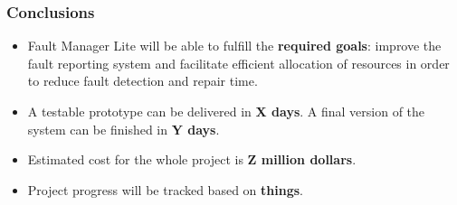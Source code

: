 \documentclass[10pt, compress,usetitleprogressbar,aspectratio=1610]{beamer}
\begin{document}
\begin{frame}
\frametitle{Conclusions}

\begin{itemize}
\item Fault Manager Lite will be able to fulfill the \textbf{required goals}: improve the fault reporting system and facilitate efficient allocation of resources in order to reduce fault detection and repair time.
\item A testable prototype can be delivered in \textbf{X days}. A final version of the system can be finished in \textbf{Y days}.
\item Estimated cost for the whole project is \textbf{Z million dollars}.
\item Project progress will be tracked based on \textbf{things}.
\end{itemize}

\end{frame}

\end{document}
